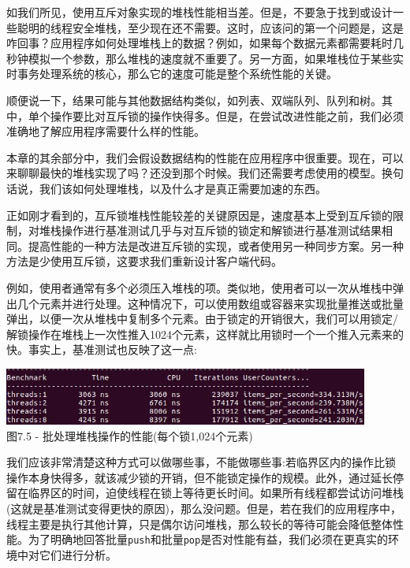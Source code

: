 如我们所见，使用互斥对象实现的堆栈性能相当差。但是，不要急于找到或设计一些聪明的线程安全堆栈，至少现在还不需要。这时，应该问的第一个问题是，这是咋回事？应用程序如何处理堆栈上的数据？例如，如果每个数据元素都需要耗时几秒钟模拟一个参数，那么堆栈的速度就不重要了。另一方面，如果堆栈位于某些实时事务处理系统的核心，那么它的速度可能是整个系统性能的关键。

顺便说一下，结果可能与其他数据结构类似，如列表、双端队列、队列和树。其中，单个操作要比对互斥锁的操作快得多。但是，在尝试改进性能之前，我们必须准确地了解应用程序需要什么样的性能。


本章的其余部分中，我们会假设数据结构的性能在应用程序中很重要。现在，可以来聊聊最快的堆栈实现了吗？还没到那个时候。我们还需要考虑使用的模型。换句话说，我们该如何处理堆栈，以及什么才是真正需要加速的东西。

正如刚才看到的，互斥锁堆栈性能较差的关键原因是，速度基本上受到互斥锁的限制，对堆栈操作进行基准测试几乎与对互斥锁的锁定和解锁进行基准测试结果相同。提高性能的一种方法是改进互斥锁的实现，或者使用另一种同步方案。另一种方法是少使用互斥锁，这要求我们重新设计客户端代码。

例如，使用者通常有多个必须压入堆栈的项。类似地，使用者可以一次从堆栈中弹出几个元素并进行处理。这种情况下，可以使用数组或容器来实现批量推送或批量弹出，以便一次从堆栈中复制多个元素。由于锁定的开销很大，我们可以用锁定/解锁操作在堆栈上一次性推入1024个元素，这样就比用锁时一个一个推入元素来的快。事实上，基准测试也反映了这一点:

\begin{center}
\includegraphics[width=0.9\textwidth]{content/2/chapter7/images/5.jpg}\\
图7.5 - 批处理堆栈操作的性能(每个锁1,024个元素)
\end{center}

我们应该非常清楚这种方式可以做哪些事，不能做哪些事:若临界区内的操作比锁操作本身快得多，就该减少锁的开销，但不能锁定操作的规模。此外，通过延长停留在临界区的时间，迫使线程在锁上等待更长时间。如果所有线程都尝试访问堆栈(这就是基准测试变得更快的原因)，那么没问题。但是，若在我们的应用程序中，线程主要是执行其他计算，只是偶尔访问堆栈，那么较长的等待可能会降低整体性能。为了明确地回答批量\texttt{push}和批量\texttt{pop}是否对性能有益，我们必须在更真实的环境中对它们进行分析。

